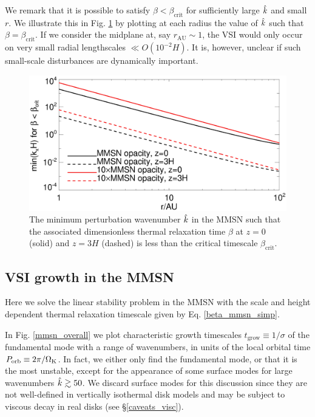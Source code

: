 
We remark that it is possible to satisfy $\beta < \beta_\mathrm{crit}$
for sufficiently large $\hat{k}$ and small $r$. We illustrate this in 
Fig. \ref{mmsn_bcrit_bcool_mink} by plotting at each radius the value
of $\hat{k}$ such that $\beta = \beta_\mathrm{crit}$. If we consider the
midplane at, say $r_\mathrm{AU}\sim 1$, the VSI would only occur on very small
radial lengthscales $\ll O(10^{-2}H)$. It is, however, unclear if such
small-scale disturbances are dynamically important.  


\begin{figure}
  \includegraphics[width=\linewidth]{figures/bcrit_mink} 
  \caption{The minimum perturbation wavenumber $\hat{k}$ in
    the MMSN such that the associated dimensionless thermal
    relaxation time $\beta$ at $z=0$ (solid) and $z=3H$ (dashed) is
    less than the critical timescale $\beta_\mathrm{crit}$.   
    \label{mmsn_bcrit_bcool_mink}}   
\end{figure}  

\subsection{VSI growth in the MMSN}\label{vsi_mmsn_grow}
Here we solve the linear stability problem in the MMSN with the scale and
height dependent thermal relaxation timescale given by
Eq. \ref{beta_mmsn_simp}. 

In Fig. \ref{mmsn_overall} we plot characteristic growth timescales
$t_\mathrm{grow} \equiv 1/\sigma$ of the fundamental mode with a range of
wavenumbers, in units of the local orbital time $P_\mathrm{orb}\equiv
2\pi/\Omega_{\rm K}$. In fact, we either only find the fundamental mode, or 
that it is the most unstable, except for the appearance of some 
surface modes for large wavenumbers $\hat{k}\gtrsim 50$. We discard
surface modes for this discussion since they are not well-defined 
in vertically isothermal disk models  and may be 
subject to viscous decay in real disks (see \S\ref{caveats_visc}).  

